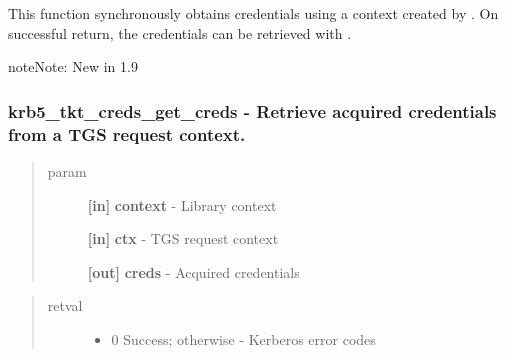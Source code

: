 \documentclass[letterpaper,10pt,english]{sphinxmanual}
\begin{document}
This function synchronously obtains credentials using a context created by {\hyperref[appdev/refs/api/krb5_tkt_creds_init:krb5_tkt_creds_init]{}} . On successful return, the credentials can be retrieved with {\hyperref[appdev/refs/api/krb5_tkt_creds_get_creds:krb5_tkt_creds_get_creds]{}} .

\begin{notice}{note}{Note:}
New in 1.9
\end{notice}


\subsubsection{krb5\_tkt\_creds\_get\_creds -  Retrieve acquired credentials from a TGS request context.}
\label{appdev/refs/api/krb5_tkt_creds_get_creds:krb5-tkt-creds-get-creds-retrieve-acquired-credentials-from-a-tgs-request-context}\label{appdev/refs/api/krb5_tkt_creds_get_creds::doc}

\begin{fulllineitems}
\label{appdev/refs/api/krb5_tkt_creds_get_creds:krb5_tkt_creds_get_creds}
\end{fulllineitems}

\begin{quote}\begin{description}
\item[{param}] \leavevmode
\textbf{{[}in{]}} \textbf{context} - Library context

\textbf{{[}in{]}} \textbf{ctx} - TGS request context

\textbf{{[}out{]}} \textbf{creds} - Acquired credentials

\end{description}\end{quote}
\begin{quote}\begin{description}
\item[{retval}] \leavevmode\begin{itemize}
\item {} 
0   Success; otherwise - Kerberos error codes

\end{itemize}

\end{description}\end{quote}
\end{document}
